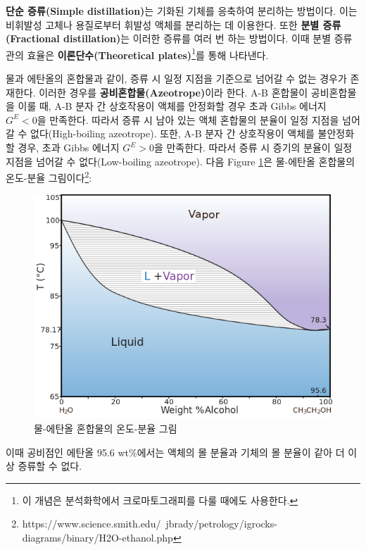         \par \textbf{단순 증류(Simple distillation)}는 기화된 기체를 응축하여 분리하는 방법이다. 이는 비휘발성 고체나 용질로부터 휘발성 액체를 분리하는 데 이용한다. 
        또한 \textbf{분별 증류(Fractional distillation)}는 이러한 증류를 여러 번 하는 방법이다. 이때 분별 증류관의 효율은 
        \textbf{이론단수(Theoretical plates)}\footnote[13]{이 개념은 분석화학에서 크로마토그래피를 다룰 때에도 사용한다.}를 통해 나타낸다.
        \par 물과 에탄올의 혼합물과 같이, 증류 시 일정 지점을 기준으로 넘어갈 수 없는 경우가 존재한다. 이러한 경우를 \textbf{공비혼합물(Azeotrope)}이라 한다. 
        A-B 혼합물이 공비혼합물을 이룰 때, A-B 분자 간 상호작용이 액체를 안정화할 경우 초과 Gibbs 에너지 $G^E <0$을 만족한다. 따라서 증류 시 
        남아 있는 액체 혼합물의 분율이 일정 지점을 넘어갈 수 없다(High-boiling azeotrope). 또한, A-B 분자 간 상호작용이 액체를 불안정화할 경우, 
        초과 Gibbs 에너지 $G^E >0$을 만족한다. 따라서 증류 시 증기의 분율이 일정 지점을 넘어갈 수 없다(Low-boiling azeotrope). 다음 Figure \ref{f11}은 물-에탄올 혼합물의 
        온도-분율 그림이다\footnote[14]{https://www.science.smith.edu/~jbrady/petrology/igrocks-diagrams/binary/H2O-ethanol.php}:\\
        \begin{figure}[H]
            \centering
            \includegraphics[scale=0.5]{Images/waterethanolazeo}
            \caption{물-에탄올 혼합물의 온도-분율 그림}\label{f11}
        \end{figure}
        이때 공비점인 에탄올 95.6 wt\%에서는 액체의 몰 분율과 기체의 몰 분율이 같아 더 이상 증류할 수 없다.
